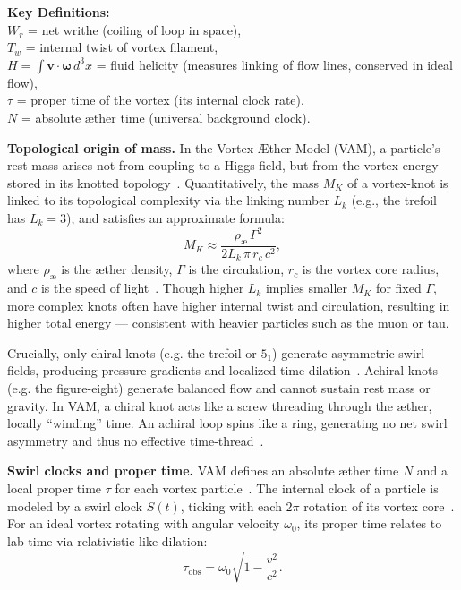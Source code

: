 \textbf{Key Definitions:} \\
$W_r$ = net writhe (coiling of loop in space),\\
$T_w$ = internal twist of vortex filament,\\
$H = \int \mathbf{v}\cdot\boldsymbol{\omega}\,d^3x$ = fluid helicity (measures linking of flow lines, conserved in ideal flow),\\
$\tau$ = proper time of the vortex (its internal clock rate),\\
$N$ = absolute æther time (universal background clock).

\textbf{Topological origin of mass.} In the Vortex Æther Model (VAM), a particle’s rest mass arises not from coupling to a Higgs field, but from the vortex energy stored in its knotted topology~\cite{iskandarani2025vam5}. Quantitatively, the mass $M_K$ of a vortex-knot is linked to its topological complexity via the linking number $L_k$ (e.g., the trefoil has $L_k = 3$), and satisfies an approximate formula:
\[
M_K \approx \frac{\rho_{\text{\ae}}\, \Gamma^2}{2 L_k\, \pi\, r_c\, c^2},
\]
where $\rho_{\text{\ae}}$ is the æther density, $\Gamma$ is the circulation, $r_c$ is the vortex core radius, and $c$ is the speed of light~\cite{iskandarani2025vam5}. Though higher $L_k$ implies smaller $M_K$ for fixed $\Gamma$, more complex knots often have higher internal twist and circulation, resulting in higher total energy — consistent with heavier particles such as the muon or tau.

Crucially, only chiral knots (e.g. the trefoil or $5_1$) generate asymmetric swirl fields, producing pressure gradients and localized time dilation~\cite{iskandarani2025vam5}. Achiral knots (e.g. the figure-eight) generate balanced flow and cannot sustain rest mass or gravity. In VAM, a chiral knot acts like a screw threading through the æther, locally “winding” time. An achiral loop spins like a ring, generating no net swirl asymmetry and thus no effective time-thread~\cite{iskandarani2025vam5}.

\textbf{Swirl clocks and proper time.} VAM defines an absolute æther time $N$ and a local proper time $\tau$ for each vortex particle~\cite{iskandarani2025vam1}. The internal clock of a particle is modeled by a swirl clock $S(t)$, ticking with each $2\pi$ rotation of its vortex core~\cite{iskandarani2025vam1}. For an ideal vortex rotating with angular velocity $\omega_0$, its proper time relates to lab time via relativistic-like dilation:
\[
\tau_{\text{obs}} = \omega_0 \sqrt{1 - \frac{v^2}{c^2}}.
\]

